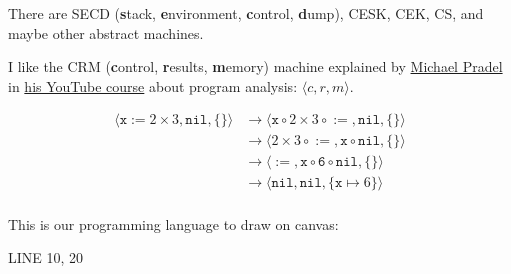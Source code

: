 \documentclass{article}
\begin{document}
\plush{}



There are SECD (\textbf{s}tack, \textbf{e}nvironment, \textbf{c}ontrol, \textbf{d}ump),
CESK, CEK, CS, and maybe other abstract machines.

I like the CRM (\textbf{c}ontrol, \textbf{r}esults, \textbf{m}emory) machine explained by
\href{https://software-lab.org/people/Michael_Pradel.html}{Michael Pradel} in
\href{https://www.youtube.com/watch?v=YRfb2zDk_qs}{his YouTube course} about program analysis:
$\langle c, r, m\rangle$.

\begin{equation*}
\begin{split}
\langle \texttt{x} \mathrel{\texttt{:=}} 2 \times 3, \texttt{nil}, \{\} \rangle
  & \longrightarrow \langle \texttt{x} \mathrel{\circ} 2 \times 3 \mathrel{\circ} \mathrel{\texttt{:=}}, \texttt{nil}, \{ \}\rangle \\
  & \longrightarrow \langle 2 \times 3 \mathrel{\circ} \mathrel{\texttt{:=}}, \texttt{x} \mathrel{\circ} \texttt{nil}, \{ \}\rangle \\
  & \longrightarrow \langle \mathrel{\texttt{:=}}, \texttt{x} \mathrel{\circ} \texttt{6} \mathrel{\circ} \texttt{nil}, \{ \}\rangle \\
  & \longrightarrow \langle \texttt{nil}, \texttt{nil}, \{ \texttt{x} \mapsto 6 \}\rangle \\
\end{split}
\end{equation*}

\plush{}


This is our programming language to draw on canvas:

\begin{ffcode}
LINE 10, 20
\end{ffcode}
\end{document}
